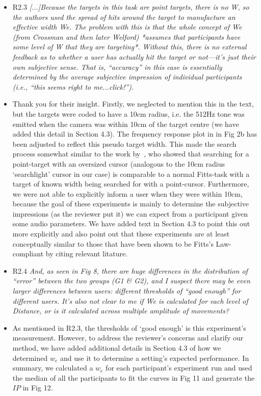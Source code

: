 \documentclass{scrartcl}
\begin{document}
\begin{itemize}
  \item R2.3 \textit{[...]Because the targets in this task are point targets, there is no W, so the authors used the spread of hits around the target to manufacture an effective width We. The problem with this is that the whole concept of We (from Crossman and then later Welford) *assumes that participants have some level of W that they are targeting*. Without this, there is no external feedback as to whether a user has actually hit the target or not—it’s just their own subjective sense. That is, ``accuracy'' in this case is essentially determined by the average subjective impression of individual participants (i.e., ``this seems right to me...click!'').  }
  \item[] Thank you for their insight.
    Firstly, we neglected to mention this in the text, but the targets were coded to have a 10cm radius, i.e. the 512Hz tone was emitted when the camera was within 10cm of the target centre (we have added this detail in Section 4.3).
    The frequency response plot in in Fig 2b has been adjusted to reflect this pseudo target width.
    This made the search process somewhat similar to the work by~\cite{kabbash1995prince}, who showed that searching for a point-target with an oversized cursor (analogous to the 10cm radius `searchlight' cursor in our case) is comparable to a normal Fitts-task with a target of known width being searched for with a point-cursor.
    Furthermore, we were not able to explicitly inform a user when they were within 10cm, because the goal of these experiments is mainly to determine the subjective impressions (as the reviewer put it) we can expect from a participant given some audio parameters.
    We have added text in Section 4.3 to point this out more explicitly and also point out that these experiments are at least conceptually similar to those that have been shown to be Fitts's Law-compliant by citing relevant litature. 

  \item R2.4 \textit{And, as seen in Fig 8, there are huge differences in the distribution of ``error'' between the two groups (G1 \& G2), and I suspect there may be even larger differences between users: different thresholds of ``good enough'' for different users. It’s also not clear to me if We is calculated for each level of Distance, or is it calculated across multiple amplitude of movements?}
  \item[] As mentioned in R2.3, the thresholds of `good enough' is this experiment's measurement.
    However, to address the reviewer's concerns and clarify our method, we have added additional details in Section 4.3 of how we determined $w_e$ and use it to determine a setting's expected performance. 
    In summary, we calculated a $w_e$ for each participant's experiment run and used the median of all the participants to fit the curves in Fig 11 and generate the $IP$ in Fig 12. 


\end{itemize}
\end{document}
